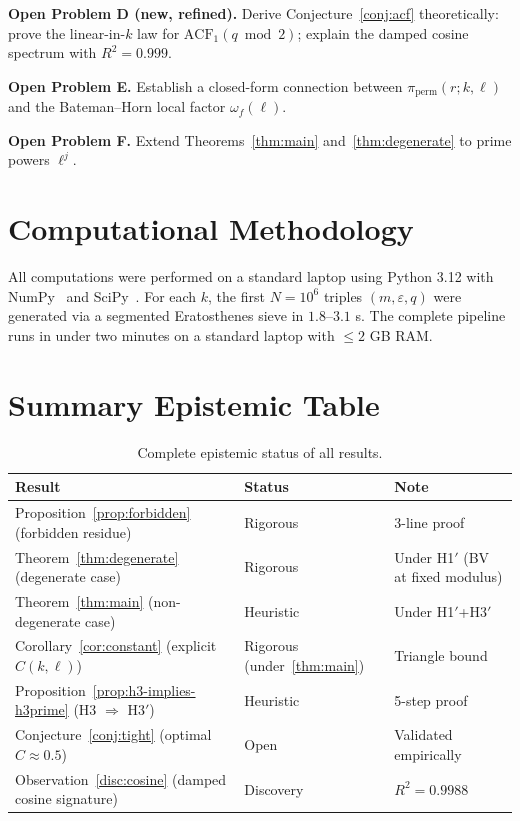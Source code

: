 \documentclass[11pt,a4paper]{article}
\theoremstyle{plain}
\theoremstyle{definition}
\newcommand{\PiP}{\pi_{\mathrm{perm}}}
\newcommand{\eps}{\varepsilon}
\begin{document}
\begin{openproblem}
\textbf{Open Problem D (new, refined).} Derive Conjecture~\ref{conj:acf}
theoretically: prove the linear-in-$k$ law for $\mathrm{ACF}_1(q \bmod 2)$;
explain the damped cosine spectrum with $R^2 = 0.999$.
\end{openproblem}

\begin{openproblem}
\textbf{Open Problem E.} Establish a closed-form connection between $\PiP(r; k, \ell)$
and the Bateman--Horn local factor $\omega_f(\ell)$.
\end{openproblem}

\begin{openproblem}
\textbf{Open Problem F.} Extend Theorems~\ref{thm:main} and~\ref{thm:degenerate}
to prime powers $\ell^j$.
\end{openproblem}

\section{Computational Methodology}
\label{sec:methodology}

All computations were performed on a standard laptop using Python 3.12 with
NumPy~\cite{numpy} and SciPy~\cite{scipy}. For each $k$, the first $N = 10^6$
triples $(m, \eps, q)$ were generated via a segmented Eratosthenes sieve
in $1.8$--$3.1$ s. The complete pipeline runs in under two minutes on a
standard laptop with $\le 2$ GB RAM.

\section{Summary Epistemic Table}
\label{sec:epistemic}

\begin{table}[h!]
\centering
\caption{Complete epistemic status of all results.}
\begin{tabular}{l l p{5.5cm}}
\toprule
Result & Status & Note \\
\midrule
Proposition~\ref{prop:forbidden} (forbidden residue) & Rigorous & 3-line proof \\
Theorem~\ref{thm:degenerate} (degenerate case) & Rigorous & Under H1$'$ (BV at fixed modulus) \\
Theorem~\ref{thm:main} (non-degenerate case) & Heuristic & Under H1$'$+H3$'$ \\
Corollary~\ref{cor:constant} (explicit $C(k, \ell)$) & Rigorous (under~\ref{thm:main}) & Triangle bound \\
Proposition~\ref{prop:h3-implies-h3prime} (H3 $\Rightarrow$ H3$'$) & Heuristic & 5-step proof \\
Conjecture~\ref{conj:tight} (optimal $C \approx 0.5$) & Open & Validated empirically \\
Observation~\ref{disc:cosine} (damped cosine signature) & Discovery & $R^2 = 0.9988$ \\
\bottomrule
\end{tabular}
\end{table}
\end{document}
